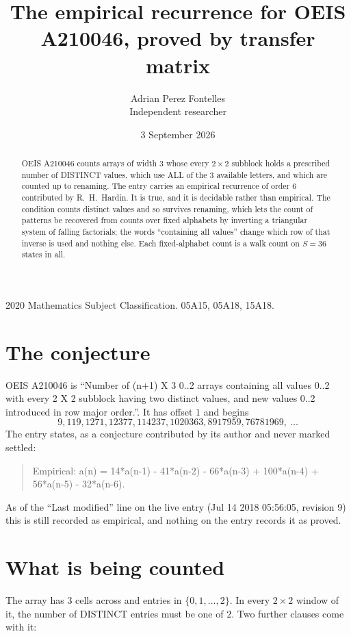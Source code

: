 \documentclass[11pt,a4paper]{article}
\title{The empirical recurrence for OEIS A210046, proved by transfer matrix}
\author{Adrian Perez Fontelles\\ \small Independent researcher}
\date{3 September 2026}
\theoremstyle{plain}
\theoremstyle{definition}
\begin{document}
\maketitle

\begin{abstract}
OEIS A210046 counts arrays of width $3$ whose every $2\times2$ subblock holds a
prescribed number of DISTINCT values, which use ALL of the $3$ available letters, and which
are counted up to renaming. The entry carries an empirical recurrence of order $6$
contributed by R.~H.~Hardin. It is true, and it is decidable rather than empirical. The
condition counts distinct values and so survives renaming, which lets the count of patterns be
recovered from counts over fixed alphabets by inverting a triangular system of falling
factorials; the words ``containing all values'' change which row of that inverse is used and
nothing else. Each fixed-alphabet count is a walk count on $S=36$ states in all.
\end{abstract}

\noindent\small 2020 Mathematics Subject Classification. 05A15, 05A18, 15A18.\normalsize

\section{The conjecture}

OEIS A210046 is ``Number of (n+1) X 3 0..2 arrays containing all values 0..2 with every 2 X 2 subblock having two distinct values, and new values 0..2 introduced in row major order.''. It has offset $1$ and begins
\[
9, 119, 1271, 12377, 114237, 1020363, 8917959, 76781969,\ \dots
\]
The entry states, as a conjecture contributed by its author and never marked settled:
\begin{quote}
Empirical: a(n) = 14*a(n-1) - 41*a(n-2) - 66*a(n-3) + 100*a(n-4) + 56*a(n-5) - 32*a(n-6).
\end{quote}
As of the ``Last modified'' line on the live entry (Jul 14 2018 05:56:05, revision 9) this is still
recorded as empirical, and nothing on the entry records it as proved.

\section{What is being counted}

The array has $3$ cells across and entries in $\{0,1,\dots,2\}$. In every
$2\times2$ window of it, the number of DISTINCT entries must be one of $2$. Two
further clauses come with it:
\end{document}
